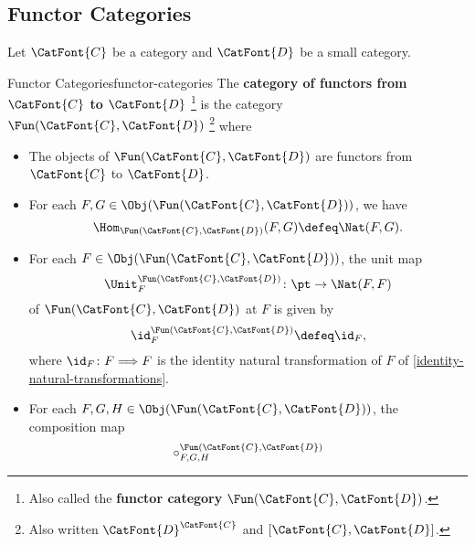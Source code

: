 \subsection{Functor Categories}\label{subsection-functor-categories}
Let $\CatFont{C}$ be a category and $\CatFont{D}$ be a small category.
\begin{definition}{Functor Categories}{functor-categories}%
    The \textbf{category of functors from $\CatFont{C}$ to $\CatFont{D}$}%
    \footnote{%
        Also called the \textbf{functor category} $\Fun(\CatFont{C},\CatFont{D})$.
    } %
    is the category $\Fun(\CatFont{C},\CatFont{D})$%
    \footnote{%
        Also written $\CatFont{D}^{\CatFont{C}}$ and $[\CatFont{C},\CatFont{D}]$.
        \par\vspace*{-1.75\baselineskip}
    } %
    where
    \begin{itemize}
        \item{}The objects of $\Fun(\CatFont{C},\CatFont{D})$ are functors from $\CatFont{C}$ to $\CatFont{D}$.
        \item{}For each $F,G\in\Obj(\Fun(\CatFont{C},\CatFont{D}))$, we have
            \[
                \Hom_{\Fun(\CatFont{C},\CatFont{D})}(F,G)
                \defeq
                \Nat(F,G).
            \]%
        \item{}For each $F\in\Obj(\Fun(\CatFont{C},\CatFont{D}))$, the unit map
            \[
                \Unit^{\Fun(\CatFont{C},\CatFont{D})}_{F}
                \colon
                \pt
                \to
                \Nat(F,F)
            \]%
            of $\Fun(\CatFont{C},\CatFont{D})$ at $F$ is given by
            \[
                \id^{\Fun(\CatFont{C},\CatFont{D})}_{F}
                \defeq
                \id_{F},
            \]%
            where $\id_{F}\colon F\Longrightarrow F$ is the identity natural transformation of $F$ of \cref{identity-natural-transformations}.
        \item{}For each $F,G,H\in\Obj(\Fun(\CatFont{C},\CatFont{D}))$, the composition map
            \[
                \circ^{\Fun(\CatFont{C},\CatFont{D})}_{F,G,H}
\]
\end{itemize}
\end{definition}
